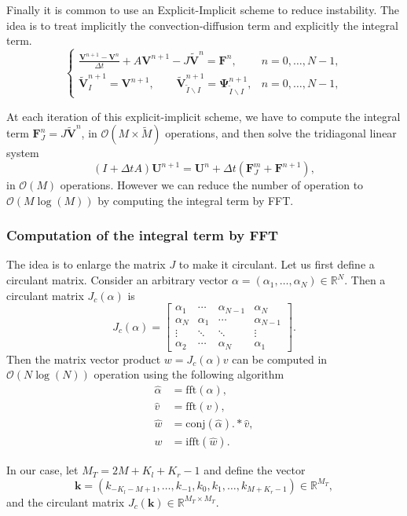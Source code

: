 Finally it is common to use an Explicit-Implicit scheme to reduce instability. The idea is to treat implicitly the convection-diffusion term and explicitly the integral term.
$$\begin{cases}
\displaystyle{\frac{\mathbf{V}^{n+1}-\mathbf{V}^n}{\Delta t}+ A\mathbf{V}^{n+1}-J\mathbf{\tilde{V}}^n = \mathbf{F}^n},&n = 0,\ldots, N-1,\\
\mathbf{\tilde{V}}_I^{n+1} = \mathbf{V}^{n+1},\qquad \mathbf{\tilde{V}}_{\tilde{I}\backslash I}^{n+1}=\mathbf{\Psi}_{\tilde{I}\backslash I}^{n+1}, &n = 0,\ldots, N-1,
\end{cases}$$

At each iteration of this explicit-implicit scheme, we have to compute the integral term $\mathbf{F}^n_J = J\mathbf{\tilde{V}}^n$, in $\mathcal{O}(M\times \tilde{M})$ operations, and then solve the tridiagonal linear system
$$(I+\Delta t A)\mathbf{U}^{n+1} = \mathbf{U}^n +\Delta t\left(\mathbf{F}^m_J+\mathbf{F}^{n+1}\right),$$ 
in $\mathcal{O}(M)$ operations.
However we can reduce the number of operation to $\mathcal{O}(M\log(M))$ by computing the integral term by FFT.

\subsubsection{Computation of the integral term by FFT}
The idea is to enlarge the matrix $J$ to make it circulant. Let us first define a circulant matrix. Consider an arbitrary vector $\alpha = (\alpha_1, \ldots, \alpha_N) \in\mathbb{R}^N$. Then a circulant matrix $J_c(\alpha)$ is
$$J_c(\alpha)=\left[
\begin{matrix}
\alpha_1 & \cdots & \alpha_{N-1} & \alpha_N \\
\alpha_N & \alpha_1 & \cdots & \alpha_{N-1} \\
\vdots & \ddots & \ddots & \vdots \\
\alpha_2& \cdots & \alpha_N &\alpha_1
\end{matrix}
\right].$$
Then the matrix vector product $w = J_c(\alpha)v$ can be computed in $\mathcal{O}(N\log(N))$ operation using the following algorithm
\begin{align*}
\hat{\alpha}&=\text{fft}(\alpha),\\
\hat{v}&=\text{fft}(v),\\
\hat{w}&= \text{conj}(\hat{\alpha}).*\hat{v},\\
w &= \text{ifft}(\hat{w}).
\end{align*}

In our case, let $M_T = 2M+K_l+K_r-1$ and define the vector
$$\mathbf{k} = (k_{-K_l-M+1},\ldots,k_{-1},k_0,k_1,\ldots,k_{M+K_r-1})\in\mathbb{R}^{M_T},$$
and the circulant matrix $J_c(\mathbf{k})\in\mathbb{R}^{M_T\times M_T}$.

